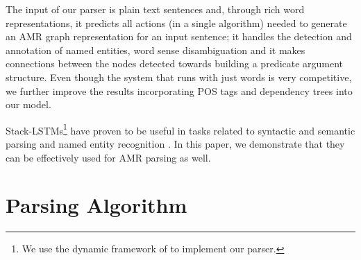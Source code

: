 \documentclass[11pt,a4paper]{article}
\begin{document}
The input of our parser is plain text sentences and, through rich word representations,  it predicts 
all actions (in a single algorithm) needed to 
generate an AMR graph representation for an input sentence; it handles the 
detection and annotation of named entities, word sense disambiguation and it 
makes connections between the nodes detected towards building a predicate 
argument structure. Even though the system that runs with just words is very competitive, 
we further improve the results incorporating POS tags and dependency trees into our model.

Stack-LSTMs\footnote{We use 
the dynamic framework of  to implement our parser.} have proven to be useful in 
tasks related to syntactic and semantic parsing 
\cite{lstmacl15,cdyer2016,SwayamdiptaBDS16} and named entity 
recognition \cite{lample2016}. In this paper, we demonstrate that they can be effectively used for AMR 
parsing as well.

\section{Parsing Algorithm}
\label{algorithm}
\end{document}
